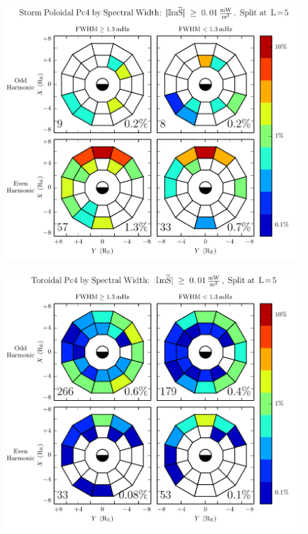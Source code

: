 \begin{figure}[!htb]
    \centering
    \includegraphics[width=\textwidth]{figures/fwhm_rate_p_storm.pdf}
    \caption[Poloidal Pc4 Rate by Compressional Coupling: Dst$< \SI{-30}{\nT}$]{
      \todo{$\cdots$}
    }
    \label{fig_fwhm_rate_p_storm}
\end{figure}

\begin{figure}[!htb]
    \centering
    \includegraphics[width=\textwidth]{figures/fwhm_rate_t_all.pdf}
    \caption[Toroidal Pc4 Rate by Compressional Coupling]{
      \todo{$\cdots$}
    }
    \label{fig_fwhm_rate_t_all}
\end{figure}

